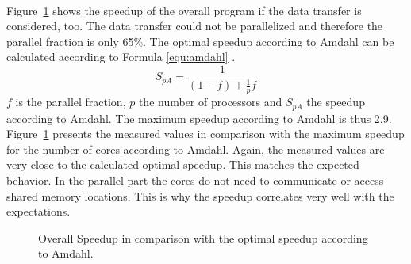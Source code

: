 \documentclass[american, hauptseminar, twoside]{zihpub}
\begin{document}
						\\
						Figure~\ref{fig:speedupamdahl} shows the speedup of the overall program if the data transfer is considered, too. The data transfer could not be parallelized and therefore the parallel fraction is only 65\%. The optimal speedup according to Amdahl can be calculated according to Formula \ref{equ:amdahl} \cite{Amdahl1967}. 
						\begin{equation}
							S_{pA} = \frac{1}{(1-f)+\frac{1}{p}f}
							\label{equ:amdahl}
						\end{equation}
						$f$ is the parallel fraction, $p$ the number of processors and $S_{pA}$ the speedup according to Amdahl. The maximum speedup according to Amdahl is thus 2.9. Figure~\ref{fig:speedupamdahl} presents the measured values in comparison with the maximum speedup for the number of cores according to Amdahl. Again, the measured values are very close to the calculated optimal speedup. This matches the expected behavior. In the parallel part the cores do not need to communicate or access shared memory locations. This is why the speedup correlates very well with the expectations.
						\begin{figure}[H]
							\centering
							\caption{Overall Speedup in comparison with the optimal speedup according to Amdahl.}
							\label{fig:speedupamdahl}
						\end{figure}
						\clearpage
\end{document}
